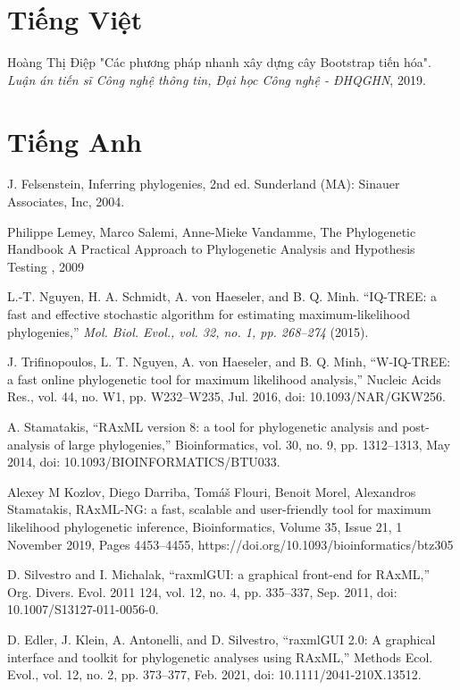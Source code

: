 \documentclass[12pt]{report}
\begin{document}
\begin{thebibliography}{10}
\section*{Tiếng Việt}
	Hoàng Thị Điệp "Các phương pháp nhanh xây dựng cây Bootstrap tiến hóa". \textit{Luận án tiến sĩ Công nghệ thông tin, Đại học Công nghệ - ĐHQGHN}, 2019.
	
\section*{Tiếng Anh}
	J. Felsenstein, Inferring phylogenies, 2nd ed. Sunderland (MA): Sinauer Associates, Inc, 2004.
	
	Philippe Lemey, Marco Salemi, Anne-Mieke Vandamme, The Phylogenetic Handbook A Practical Approach to Phylogenetic Analysis and Hypothesis Testing , 2009

	L.-T. Nguyen, H. A. Schmidt, A. von Haeseler, and B. Q. Minh.
	“IQ-TREE: a fast and effective stochastic algorithm for estimating maximum-likelihood phylogenies,” \textit{Mol. Biol. Evol., vol. 32, no. 1, pp. 268–274} (2015).
	
	J. Trifinopoulos, L. T. Nguyen, A. von Haeseler, and B. Q. Minh, “W-IQ-TREE: a fast online phylogenetic tool for maximum likelihood analysis,” Nucleic Acids Res., vol. 44, no. W1, pp. W232–W235, Jul. 2016, doi: 10.1093/NAR/GKW256.
	
	A. Stamatakis, “RAxML version 8: a tool for phylogenetic analysis and post-analysis of large phylogenies,” Bioinformatics, vol. 30, no. 9, pp. 1312–1313, May 2014, doi: 10.1093/BIOINFORMATICS/BTU033.
	
	Alexey M Kozlov, Diego Darriba, Tomáš Flouri, Benoit Morel, Alexandros Stamatakis, RAxML-NG: a fast, scalable and user-friendly tool for maximum likelihood phylogenetic inference, Bioinformatics, Volume 35, Issue 21, 1 November 2019, Pages 4453–4455, https://doi.org/10.1093/bioinformatics/btz305
	
	D. Silvestro and I. Michalak, “raxmlGUI: a graphical front-end for RAxML,” Org. Divers. Evol. 2011 124, vol. 12, no. 4, pp. 335–337, Sep. 2011, doi: 10.1007/S13127-011-0056-0.
	
	D. Edler, J. Klein, A. Antonelli, and D. Silvestro, “raxmlGUI 2.0: A graphical interface and toolkit for phylogenetic analyses using RAxML,” Methods Ecol. Evol., vol. 12, no. 2, pp. 373–377, Feb. 2021, doi: 10.1111/2041-210X.13512.
	

\end{thebibliography}
\end{document}
